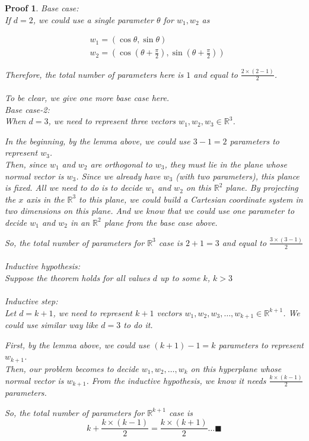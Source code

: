 \newtheorem*{mproof}{Proof}
\begin{mproof}\normalfont

\emph{Base case}: \\
If $d=2$, we could use a single parameter $\theta$ for $w_1, w_2$ as

\begin{equation}
\begin{aligned}
& w_1 = ( \cos\theta,\sin\theta ) \\
& w_2 = ( \cos(\theta + \frac{\pi}{2}),\sin(\theta + \frac{\pi}{2}) )
\end{aligned}
\end{equation}

Therefore, the total number of parameters here is $1$ and equal to $\frac{2\times (2-1)}{2}$.
\\ \\
To be clear, we give one more base case here.
\\ 
\emph{Base case-2}:\\
When $d=3$, we need to represent three vectors $w_1,w_2,w_3\in \mathbb{R}^3$.

In the beginning, by the lemma above, we could use $3-1=2$ parameters to represent $w_3$.  \\
Then, since $w_1$ and $w_2$ are orthogonal to $w_3$, they must lie in the plane whose normal vector is $w_3$.  Since we already have $w_3$ (with two parameters), this plance is fixed.  All we need to do is to decide $w_1$ and $w_2$ on this $\mathbb{R}^2$ plane.  By projecting the $x$ axis in the $\mathbb{R}^3$ to this plane, we could build a Cartesian coordinate system in two dimensions on this plane. And we know that we could use one parameter to decide $w_1$ and $w_2$ in an $\mathbb{R}^2$ plane from the base case above.

So, the total number of parameters for $\mathbb{R}^3$ case is $2+1=3$ and equal to $\frac{3\times (3-1)}{2}$
\\ \\
\emph{Inductive hypothesis}: \\
Suppose the theorem holds for all values $d$ up to some $k$, $k > 3$
\\ \\
\emph{Inductive step}: \\
Let $d=k+1$, we need to represent $k+1$ vectors $w_1,w_2,w_3,\ldots,w_{k+1}\in \mathbb{R}^{k+1}$. We could use similar way like $d=3$ to do it.

First, by the lemma above, we could use $(k+1)-1=k$ parameters to represent $w_{k+1}$.  \\
Then, our problem becomes to decide $w_1,w_2,\ldots,w_k$ on this hyperplane whose normal vector is $w_{k+1}$.  From the inductive hypothesis, we know it needs $\frac{k\times (k-1)}{2}$ parameters.

So, the total number of parameters for $\mathbb{R}^{k+1}$ case is 
\[
k + \frac{k\times (k-1)}{2} = \frac{k\times (k+1)}{2}
\ldots\blacksquare
\]
\end{mproof}


